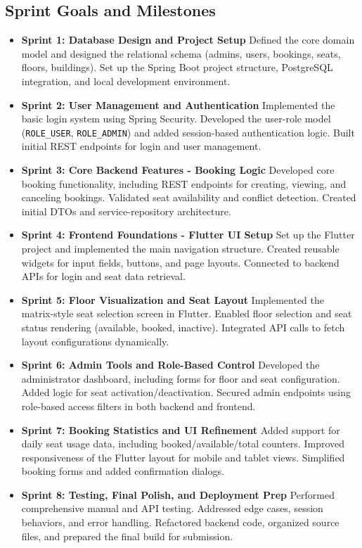 \documentclass[12pt,a4paper]{report} %
\begin{document}
\subsection*{Sprint Goals and Milestones}
\begin{itemize}
    \item \textbf{Sprint 1: Database Design and Project Setup}  
    Defined the core domain model and designed the relational schema (admins, users, bookings, seats, floors, buildings). Set up the Spring Boot project structure, PostgreSQL integration, and local development environment.
    \item \textbf{Sprint 2: User Management and Authentication}  
    Implemented the basic login system using Spring Security. Developed the user-role model (\texttt{ROLE\_USER}, \texttt{ROLE\_ADMIN}) and added session-based authentication logic. Built initial REST endpoints for login and user management.
    \item \textbf{Sprint 3: Core Backend Features - Booking Logic}  
    Developed core booking functionality, including REST endpoints for creating, viewing, and canceling bookings. Validated seat availability and conflict detection. Created initial DTOs and service-repository architecture.
    \item \textbf{Sprint 4: Frontend Foundations - Flutter UI Setup}  
    Set up the Flutter project and implemented the main navigation structure. Created reusable widgets for input fields, buttons, and page layouts. Connected to backend APIs for login and seat data retrieval.
    \item \textbf{Sprint 5: Floor Visualization and Seat Layout}  
    Implemented the matrix-style seat selection screen in Flutter. Enabled floor selection and seat status rendering (available, booked, inactive). Integrated API calls to fetch layout configurations dynamically.
    \item \textbf{Sprint 6: Admin Tools and Role-Based Control}  
    Developed the administrator dashboard, including forms for floor and seat configuration. Added logic for seat activation/deactivation. Secured admin endpoints using role-based access filters in both backend and frontend.
    \item \textbf{Sprint 7: Booking Statistics and UI Refinement}  
    Added support for daily seat usage data, including booked/available/total counters. Improved responsiveness of the Flutter layout for mobile and tablet views. Simplified booking forms and added confirmation dialogs.
    \item \textbf{Sprint 8: Testing, Final Polish, and Deployment Prep}  
    Performed comprehensive manual and API testing. Addressed edge cases, session behaviors, and error handling. Refactored backend code, organized source files, and prepared the final build for submission.
\end{itemize}
\end{document}

